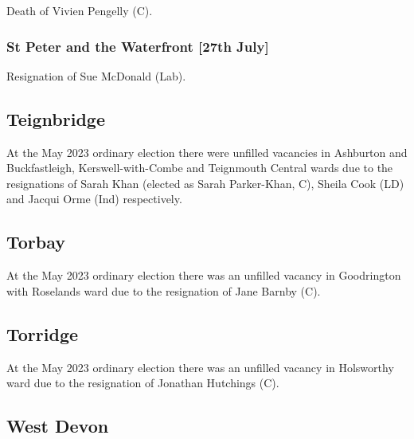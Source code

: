 \documentclass[a4paper,openany]{book}
\begin{document}
\begin{resultsiii}

Death of Vivien Pengelly (C).

\subsubsection*{St Peter and the Waterfront \hspace*{\fill}\nolinebreak[1]%
	\enspace\hspace*{\fill}
	[27th July]}


Resignation of Sue McDonald (Lab).

\subsection*{Teignbridge}

At the May 2023 ordinary election there were unfilled vacancies in Ashburton and Buckfastleigh, Kerswell-with-Combe and Teignmouth Central wards due to the resignations of Sarah Khan (elected as Sarah Parker-Khan, C), Sheila Cook (LD) and Jacqui Orme (Ind) respectively.%
%

\subsection*{Torbay}

At the May 2023 ordinary election there was an unfilled vacancy in Goodrington with Roselands ward due to the resignation of Jane Barnby (C).%

\subsection*{Torridge}

At the May 2023 ordinary election there was an unfilled vacancy in Holsworthy ward due to the resignation of Jonathan Hutchings (C).%

\subsection*{West Devon}


\end{resultsiii}
\end{document}
